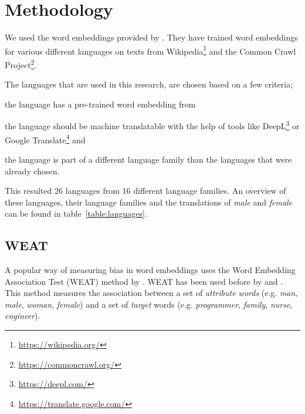\section{Methodology} \label{ch:method}
We used the word embeddings provided by \textcite{grave2018learning}. They have
trained word embeddings for various different languages on texts from
Wikipedia\footnote{\url{https://wikipedia.org/}} and
the Common Crawl Project\footnote{\url{https://commoncrawl.org/}}.

The languages that are used in this research, are chosen based on a
few criteria;
\begin{enumerate*}[label={(\alph*)}]
    \item the language has a pre-trained word embedding from \textcite{grave2018learning}
    \item the language should be machine translatable with the help of tools like
        DeepL\footnote{\url{https://deepl.com/}} or
        Google Translate\footnote{\url{https://translate.google.com/}} and
    \item the language is part of a different language family than the languages that
    were already chosen.
\end{enumerate*}
This resulted 26 languages from 16 different language families. An overview of these languages, their language families and the translations of \textit{male} and \textit{female}
can be found in table~\ref{table:languages}.

\subsection{WEAT} \label{section:method:weat}
A popular way of measuring bias in word embeddings uses the 
Word Embedding Association Test (WEAT) method by
\textcite{caliskan_2017_semantics_language_corpora}. 
WEAT has been used before by \textcite{gonen-goldberg-2019-lipstick-pig}
and \textcite{10.1145/3306618.3314270}.
This method measures the
association between a set of \textit{attribute words} (e.g. \textit{man}, \textit{male},
\textit{woman}, \textit{female}) 
and a set of \textit{target} words (e.g. \textit{programmer}, \textit{family},
\textit{nurse}, \textit{engineer}). 

